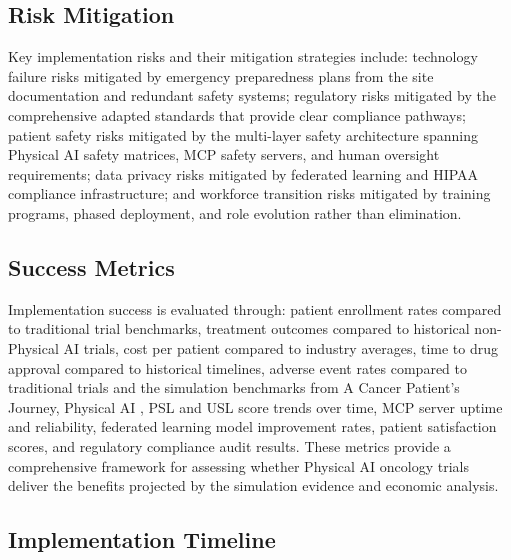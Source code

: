 \subsection{Risk Mitigation}
\label{subsec:impl-risk}

Key implementation risks and their mitigation strategies include: technology
failure risks mitigated by emergency preparedness plans from the site
documentation \cite{site-docs} and redundant safety systems; regulatory risks
mitigated by the comprehensive adapted standards that provide clear compliance
pathways; patient safety risks mitigated by the multi-layer safety architecture
spanning Physical AI safety matrices, MCP safety servers, and human oversight
requirements; data privacy risks mitigated by federated learning
\cite{fl-paper} and HIPAA \cite{hipaa} compliance infrastructure; and workforce
transition risks mitigated by training programs, phased deployment, and role
evolution rather than elimination.

\subsection{Success Metrics}
\label{subsec:impl-metrics}

Implementation success is evaluated through: patient enrollment rates compared
to traditional trial benchmarks, treatment outcomes compared to historical
non-Physical AI trials, cost per patient compared to industry averages, time
to drug approval compared to historical timelines, adverse event rates compared
to traditional trials and the simulation benchmarks from A Cancer Patient's
Journey, Physical AI \cite{patient-journey-paper}, PSL and USL score trends
over time, MCP server uptime and reliability, federated learning model
improvement rates, patient satisfaction scores, and regulatory compliance audit
results. These metrics provide a comprehensive framework for assessing whether
Physical AI oncology trials deliver the benefits projected by the simulation
evidence and economic analysis.

\subsection{Implementation Timeline}
\label{subsec:impl-timeline}


